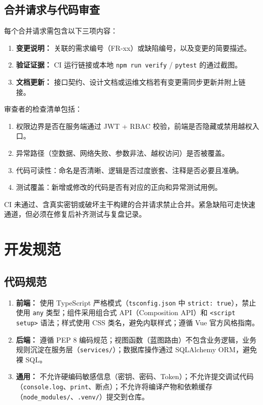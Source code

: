 \documentclass[12pt,a4paper]{ctexart}
\begin{document}
\subsection{合并请求与代码审查}
每个合并请求需包含以下三项内容：
\begin{enumerate}
\item \textbf{变更说明：} 关联的需求编号（FR-xx）或缺陷编号，以及变更的简要描述。
\item \textbf{验证证据：} CI 运行链接或本地 \texttt{npm run verify} / \texttt{pytest} 的通过截图。
\item \textbf{文档更新：} 接口契约、设计文档或运维文档若有变更需同步更新并附上链接。
\end{enumerate}
审查者的检查清单包括：
\begin{enumerate}
\item 权限边界是否在服务端通过 JWT + RBAC 校验，前端是否隐藏或禁用越权入口。
\item 异常路径（空数据、网络失败、参数非法、越权访问）是否被覆盖。
\item 代码可读性：命名是否清晰、逻辑是否过度嵌套、注释是否必要且准确。
\item 测试覆盖：新增或修改的代码是否有对应的正向和异常测试用例。
\end{enumerate}
CI 未通过、含真实密钥或破坏主干构建的合并请求禁止合并。紧急缺陷可走快速通道，但必须在修复后补齐测试与复盘记录。

\section{开发规范}
\subsection{代码规范}
\begin{enumerate}
\item \textbf{前端：} 使用 TypeScript 严格模式（\texttt{tsconfig.json} 中 \texttt{strict: true}），禁止使用 \texttt{any} 类型；组件采用组合式 API（Composition API）和 \texttt{<script setup>} 语法；样式使用 CSS 类名，避免内联样式；遵循 Vue 官方风格指南。
\item \textbf{后端：} 遵循 PEP 8 编码规范；视图函数（蓝图路由）不包含业务逻辑，业务规则沉淀在服务层（\texttt{services/}）；数据库操作通过 SQLAlchemy ORM，避免裸 SQL。
\item \textbf{通用：} 不允许硬编码敏感信息（密钥、密码、Token）；不允许提交调试代码（\texttt{console.log}、\texttt{print}、断点）；不允许将编译产物和依赖缓存（\texttt{node\_modules/}、\texttt{.venv/}）提交到仓库。
\end{enumerate}
\end{document}
